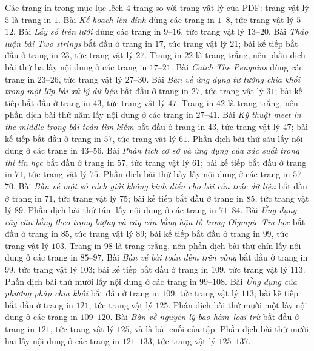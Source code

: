 \documentclass[11pt]{article}
\begin{document}
Các trang in trong mục lục lệch \(4\) trang so với trang vật lý của PDF: trang
vật lý \(5\) là trang in \(1\). Bài \emph{Kế hoạch lên đỉnh} dùng các trang
in \(1\)--\(8\), tức trang vật lý \(5\)--\(12\). Bài \emph{Lấy số trên lưới}
dùng các trang in \(9\)--\(16\), tức trang vật lý \(13\)--\(20\). Bài
\emph{Thảo luận bài Two strings} bắt đầu ở trang in \(17\), tức trang vật lý
\(21\); bài kế tiếp bắt đầu ở trang in \(23\), tức trang vật lý \(27\). Trang
in \(22\) là trang trắng, nên phần dịch bài thứ ba lấy nội dung ở các trang
in \(17\)--\(21\). Bài \emph{Catch The Penguins} dùng các trang in
\(23\)--\(26\), tức trang vật lý \(27\)--\(30\). Bài \emph{Bàn về ứng dụng
tư tưởng chia khối trong một lớp bài xử lý dữ liệu} bắt đầu ở trang in
\(27\), tức trang vật lý \(31\); bài kế tiếp bắt đầu ở trang in \(43\), tức
trang vật lý \(47\). Trang in \(42\) là trang trắng, nên phần dịch bài thứ
năm lấy nội dung ở các trang in \(27\)--\(41\).
Bài \emph{Kỹ thuật meet in the middle trong bài toán tìm kiếm} bắt đầu ở
trang in \(43\), tức trang vật lý \(47\); bài kế tiếp bắt đầu ở trang in
\(57\), tức trang vật lý \(61\). Phần dịch bài thứ sáu lấy nội dung ở các
trang in \(43\)--\(56\).
Bài \emph{Phân tích cơ sở và ứng dụng của xác suất trong thi tin học} bắt
đầu ở trang in \(57\), tức trang vật lý \(61\); bài kế tiếp bắt đầu ở trang
in \(71\), tức trang vật lý \(75\). Phần dịch bài thứ bảy lấy nội dung ở các
trang in \(57\)--\(70\).
Bài \emph{Bàn về một số cách giải không kinh điển cho bài cấu trúc dữ liệu}
bắt đầu ở trang in \(71\), tức trang vật lý \(75\); bài kế tiếp bắt đầu ở
trang in \(85\), tức trang vật lý \(89\). Phần dịch bài thứ tám lấy nội dung
ở các trang in \(71\)--\(84\).
Bài \emph{Ứng dụng cây cân bằng theo trọng lượng và cây cân bằng hậu tố trong
Olympic Tin học} bắt đầu ở trang in \(85\), tức trang vật lý \(89\); bài kế
tiếp bắt đầu ở trang in \(99\), tức trang vật lý \(103\). Trang in \(98\) là
trang trắng, nên phần dịch bài thứ chín lấy nội dung ở các trang in
\(85\)--\(97\).
Bài \emph{Bàn về bài toán đếm trên vòng} bắt đầu ở trang in \(99\), tức
trang vật lý \(103\); bài kế tiếp bắt đầu ở trang in \(109\), tức trang vật
lý \(113\). Phần dịch bài thứ mười lấy nội dung ở các trang in
\(99\)--\(108\).
Bài \emph{Ứng dụng của phương pháp chia khối} bắt đầu ở trang in \(109\), tức
trang vật lý \(113\); bài kế tiếp bắt đầu ở trang in \(121\), tức trang vật
lý \(125\). Phần dịch bài thứ mười một lấy nội dung ở các trang in
\(109\)--\(120\).
Bài \emph{Bàn về nguyên lý bao hàm--loại trừ} bắt đầu ở trang in \(121\), tức
trang vật lý \(125\), và là bài cuối của tập. Phần dịch bài thứ mười hai lấy
nội dung ở các trang in \(121\)--\(133\), tức trang vật lý \(125\)--\(137\).
\end{document}
